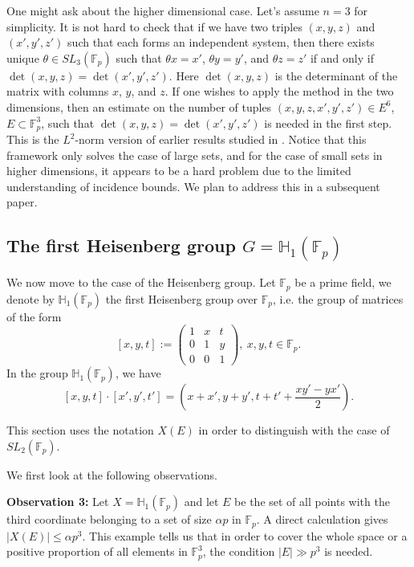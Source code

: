 \documentclass[11pt]{article}
\def\Fbb{\mathbb{F}}
\begin{document}
One might ask about the higher dimensional case. Let's assume $n=3$ for simplicity. It is not hard to check that if we have two triples $(x, y, z)$ and $(x', y', z')$ such that each forms an independent system, then there exists unique $\theta\in SL_3(\mathbb{F}_p)$ such that $\theta x=x'$, $\theta y=y'$, and $\theta z=z'$ if and only if $\det(x, y, z)=\det(x', y', z')$. Here $\det(x, y, z)$ is the determinant of the matrix with columns $x$, $y$, and $z$. If one wishes to apply the method in the two dimensions, then an estimate on the number of tuples $(x, y, z, x', y', z')\in E^6$, $E\subset \mathbb{F}_p^3$, such that $\det(x, y, z)=\det(x', y', z')$ is needed in the first step. This is the $L^2$-norm version of earlier results studied in \cite{covert, lavinh}. Notice that this framework only solves the case of large sets, and for the case of small sets in higher dimensions, it appears to be a hard problem due to the limited understanding of incidence bounds. We plan to address this in a subsequent paper.

\subsection{The first Heisenberg group 
\texorpdfstring{$G=\mathbb{H}_1(\mathbb{F}_p)$}{H1(Fp)}}

We now move to the case of the Heisenberg group. Let $\mathbb{F}_p$ be a prime field, we denote by $\mathbb{H}_1(\mathbb{F}_p)$ the first Heisenberg group over $\mathbb{F}_p$, i.e. the group of matrices of the form 
\[ [x, y, t]:=\begin{pmatrix}1&x&t\\
0&1&y\\
0&0&1\end{pmatrix}, ~x, y, t\in \mathbb{F}_p.\]
In the group $\mathbb{H}_1(\Fbb_p)$, we have 
\[[x, y, t]\cdot [x', y', t']=\left(x+x', y+y', t+t'+\frac{xy'-yx'}{2}\right).\]

This section uses the notation $X(E)$ in order to distinguish with the case of $SL_2(\mathbb{F}_p)$.

We first look at the following observations. 

{\bf Observation 3:} 
Let $X=\mathbb{H}_1(\Fbb_p)$ and let $E$ be the set of all points with the third coordinate belonging to a set of size $\alpha p$ in $\mathbb{F}_p$. A direct calculation gives $|X(E)|\le \alpha p^3$. This example tells us that in order to cover the whole space or a positive proportion of all elements in $\mathbb{F}_p^3$, the condition $|E|\gg p^3$ is needed. 
\end{document}
